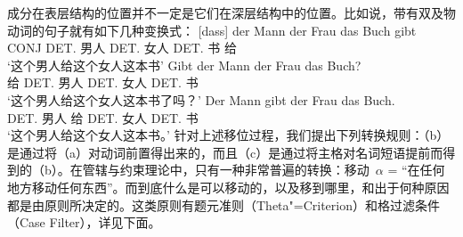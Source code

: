 成分在表层结构的位置并不一定是它们在深层结构中的位置。比如说，带有双及物动词的句子就有如下几种变换式：
\eal
\ex 
\gll {}[dass] der Mann der Frau das Buch gibt\\
	 {}\spacebr{}CONJ DET.\nom{}  男人 DET.\dat{} 女人 DET.\acc{} 书 给\\
\glt `这个男人给这个女人这本书'
\ex 
\gll Gibt der Mann der Frau das Buch?\\
	 给 DET.\nom{} 男人 DET.\dat{} 女人 DET.\acc{} 书\\
\glt `这个男人给这个女人这本书了吗？'
\ex 
\gll Der Mann gibt der Frau das Buch.\\
	 DET.\nom{} 男人 给 DET.\dat{} 女人 DET.\acc{} 书\\
\glt `这个男人给这个女人这本书。'
\zl
针对上述移位过程，我们提出下列转换规则：（b）是通过将（a）对动词前置得出来的，而且（c）是通过将主格对名词短语提前而得到的（b）。在管辖与约束理论中，只有一种非常普遍的转换：移动~$\alpha$ = ``在任何地方移动任何东西''。而到底什么是可以移动的，以及移到哪里，和出于何种原因都是由原则所决定的。这类原则有题元准则（Theta"=Criterion）和格过滤条件（Case Filter），详见下面。

